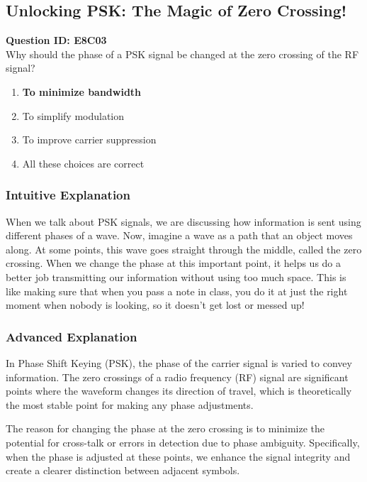 \subsection{Unlocking PSK: The Magic of Zero Crossing!}

\begin{tcolorbox}
    \textbf{Question ID: E8C03} \\
    Why should the phase of a PSK signal be changed at the zero crossing of the RF signal? 
    \begin{enumerate}[label=\Alph*.]
        \item \textbf{To minimize bandwidth}
        \item To simplify modulation
        \item To improve carrier suppression
        \item All these choices are correct
    \end{enumerate}
\end{tcolorbox}

\subsubsection{Intuitive Explanation}
When we talk about PSK signals, we are discussing how information is sent using different phases of a wave. Now, imagine a wave as a path that an object moves along. At some points, this wave goes straight through the middle, called the zero crossing. When we change the phase at this important point, it helps us do a better job transmitting our information without using too much space. This is like making sure that when you pass a note in class, you do it at just the right moment when nobody is looking, so it doesn't get lost or messed up!

\subsubsection{Advanced Explanation}
In Phase Shift Keying (PSK), the phase of the carrier signal is varied to convey information. The zero crossings of a radio frequency (RF) signal are significant points where the waveform changes its direction of travel, which is theoretically the most stable point for making any phase adjustments. 

The reason for changing the phase at the zero crossing is to minimize the potential for cross-talk or errors in detection due to phase ambiguity. Specifically, when the phase is adjusted at these points, we enhance the signal integrity and create a clearer distinction between adjacent symbols.

